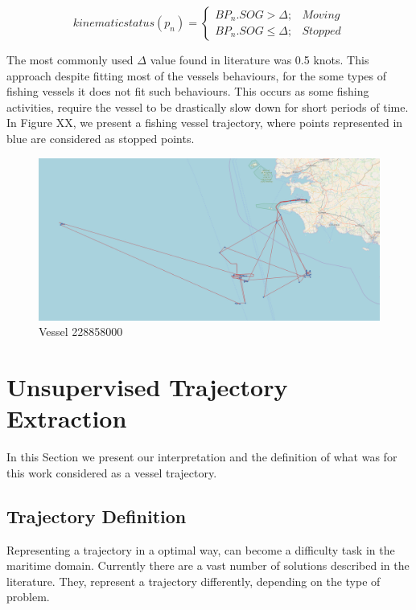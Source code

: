 \begin{equation}
kinematic status(p_n) = \left\{\begin{matrix}
BP_n.SOG > \Delta; & Moving\\ 
BP_n.SOG \leq  \Delta; & Stopped
\end{matrix}\right.
\label{eq: MovingRule}
\end{equation}

The most commonly used $\Delta$ value found in literature was 0.5 knots.
This approach despite fitting most of the vessels behaviours, for the some types of fishing vessels it does not fit such behaviours. This occurs as some fishing activities, require the vessel to be drastically slow down for short periods of time.
In Figure XX, we present a fishing vessel trajectory, where points represented in blue are considered as stopped points.   

\begin{figure}[H]
	\centering
	\includegraphics[scale = 0.2]{figures/Ch4/simplestopMoving228858000.png}
    \caption{Vessel 228858000}
    \label{fig: 228858000}
\end{figure}

\section{Unsupervised Trajectory Extraction}
\label{section: 4 Unsupervised Trajectory Extraction}
In this Section we present our interpretation and the definition of what was for this work considered as a vessel trajectory. 


\subsection{Trajectory Definition}
\label{subsection: Trajectory Definition}
Representing a trajectory in a optimal way, can become a difficulty task in the maritime domain. Currently there are a vast number of solutions described in the literature. They, represent a trajectory differently, depending on the type of problem.

